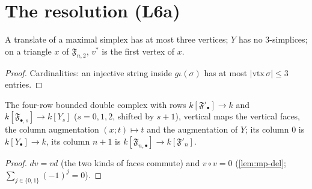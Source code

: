 \section{The resolution (L6a)}

\begin{lemma}\label{lem:mp-dim}
  \leanok
  A translate of a maximal simplex has at most three vertices; $Y$ has no $3$-simplices; on a triangle $x$ of $\mathfrak F_{n,2}$,
  $v^\ast$ is the first vertex of $x$.
\end{lemma}
\begin{proof}
  \leanok
  Cardinalities: an injective string inside $g\iota(\sigma)$ has at most $\lvert\mathrm{vtx}\,\sigma\rvert\le3$ entries.
\end{proof}

\begin{definition}\label{def:mp-grid}
  \leanok
  The four-row bounded double complex with rows $k[\mathfrak F'_\bullet]\to k$ and $k[\mathfrak F_{\bullet,s}]\to k[Y_s]$ ($s=0,1,2$,
  shifted by $s+1$), vertical maps the vertical faces, the column augmentation $(x;t)\mapsto t$ and the augmentation of $Y$; its
  column $0$ is $k[Y_\bullet]\to k$, its column $n+1$ is $k[\mathfrak F_{n,\bullet}]\to k[\mathfrak F'_n]$.
\end{definition}
\begin{proof}
  \leanok
  $dv=vd$ (the two kinds of faces commute) and $v\circ v=0$ (\ref{lem:mp-del}; $\sum_{j\in\{0,1\}}(-1)^j=0$).
\end{proof}

